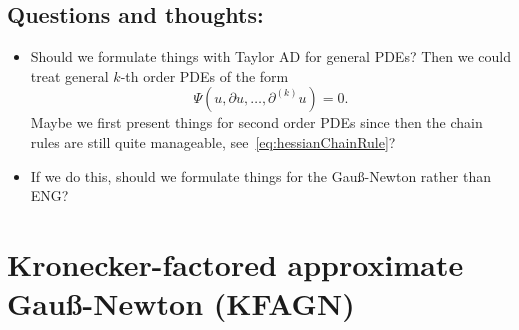 \subsection{Questions and thoughts:}

\begin{itemize}
    \item Should we formulate things with Taylor AD for general PDEs? Then we could treat general $k$-th order PDEs of the form     
    \begin{equation*}
        \Psi(u, \partial u, \dots, \partial^{(k)} u) = 0. 
    \end{equation*}
    Maybe we first present things for second order PDEs since then the chain rules are still quite manageable, see~\eqref{eq:hessianChainRule}? 
    \item If we do this, should we formulate things for the Gauß-Newton rather than ENG?
\end{itemize}

\section{Kronecker-factored approximate Gauß-Newton (KFAGN)}




\begin{comment}
    \paragraph{Alternating linear and nonlinear layers}
In particular, if $f$ is a linear and $g$ a nonlinear layer, we obtain 
\begin{align}
    \partial_i (f\circ g)(\vz) & = \mW \ve_i\sigma'(\vz_i) \quad \text{or } \jac (f\circ g)(\vz) = \mW \operatorname{diag}(\sigma'(\vz))  \\ 
    \partial_i\partial_j (f\circ g)(\vz) & = \mW \ve_i\delta_{ij} \sigma''(\vz_i). 
\end{align}
On the other hand, if $f$ is a nonlinear and $g$ a layer, we obtain 
\begin{align}
    \partial_i (f\circ g)(\vz) & =  \sigma'(\mW\vz + \vb) \odot \mW\ve_i\\ 
    \partial_i\partial_j (f\circ g)(\vz) & = \mW\ve_i \odot \sigma''(\mW\vz + \vb) \odot \mW\ve_j. 
\end{align}
Maybe, this doesn't really make all that much sense 
\end{comment}

